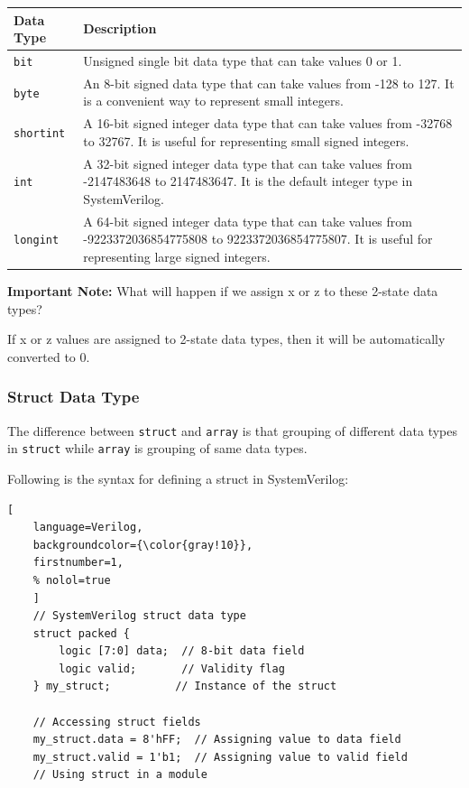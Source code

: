 \documentclass[12pt, a4paper]{article}
\begin{document}
\begin{center}
\begin{tabular}{|l|p{}|}
\hline
\textbf{Data Type} & \textbf{Description} \\
\hline
\texttt{bit} & Unsigned single bit data type that can take values 0 or 1. \\
\hline
\texttt{byte} & An 8-bit signed data type that can take values from -128 to 127. It is a convenient way to represent small integers. \\
\hline
\texttt{shortint} & A 16-bit signed integer data type that can take values from -32768 to 32767. It is useful for representing small signed integers. \\
\hline
\texttt{int} & A 32-bit signed integer data type that can take values from -2147483648 to 2147483647. It is the default integer type in SystemVerilog. \\
\hline
\texttt{longint} & A 64-bit signed integer data type that can take values from -9223372036854775808 to 9223372036854775807. It is useful for representing large signed integers. \\
\hline
\end{tabular}
\end{center}

\textbf{Important Note:} What will happen if we assign x or z to these 2-state data types?

If x or z values are assigned to 2-state data types, then it will be automatically converted to 0.

\subsubsection{Struct Data Type}
The difference between \texttt{struct} and \texttt{array}
is that grouping of different data types in \texttt{struct} while \texttt{array} is grouping of same data types.

\vspace{1em}
Following is the syntax for defining a struct in SystemVerilog:

\begin{lstlisting}[
    language=Verilog,
    backgroundcolor={\color{gray!10}},
    firstnumber=1,
    % nolol=true
    ]
    // SystemVerilog struct data type
    struct packed {
        logic [7:0] data;  // 8-bit data field
        logic valid;       // Validity flag
    } my_struct;          // Instance of the struct

    // Accessing struct fields
    my_struct.data = 8'hFF;  // Assigning value to data field
    my_struct.valid = 1'b1;  // Assigning value to valid field
    // Using struct in a module
\end{lstlisting}
\end{document}
